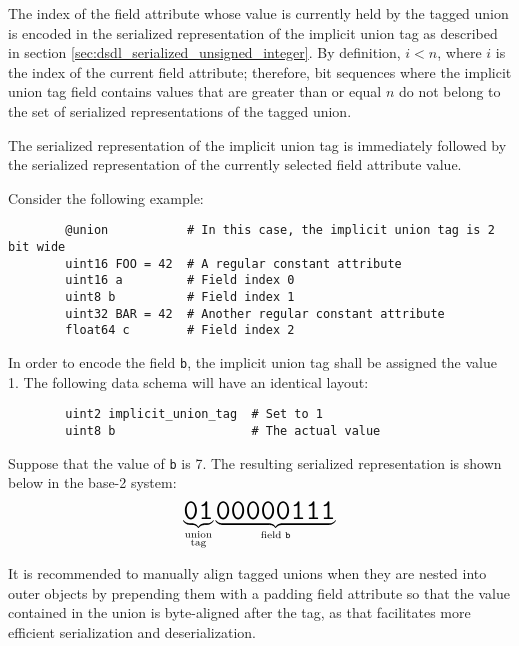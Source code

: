 The index of the field attribute whose value is currently held by the tagged union is encoded
in the serialized representation of the implicit union tag as described in section
\ref{sec:dsdl_serialized_unsigned_integer}.
By definition, $i < n$, where $i$ is the index of the current field attribute;
therefore, bit sequences where the implicit union tag field contains values
that are greater than or equal $n$ do not belong to the set of serialized representations of the tagged union.

The serialized representation of the implicit union tag is immediately followed by
the serialized representation of the currently selected field attribute value.

\begin{remark}
    Consider the following example:

    \begin{verbatim}
        @union           # In this case, the implicit union tag is 2 bit wide
        uint16 FOO = 42  # A regular constant attribute
        uint16 a         # Field index 0
        uint8 b          # Field index 1
        uint32 BAR = 42  # Another regular constant attribute
        float64 c        # Field index 2
    \end{verbatim}

    In order to encode the field \verb|b|, the implicit union tag shall be assigned the value 1.
    The following data schema will have an identical layout:

    \begin{verbatim}
        uint2 implicit_union_tag  # Set to 1
        uint8 b                   # The actual value
    \end{verbatim}

    Suppose that the value of \verb|b| is 7.
    The resulting serialized representation is shown below in the base-2 system:
    $$%
    \underbrace{\hugett{01}}_{\substack{\text{union} \\ \text{tag}}}%
    \underbrace{\hugett{00000111}}_{\text{field }\texttt{b}}%
    $$

    It is recommended to manually align tagged unions when they are nested into outer objects by
    prepending them with a padding field attribute so that the value contained in the union is byte-aligned
    after the tag, as that facilitates more efficient serialization and deserialization.
\end{remark}

